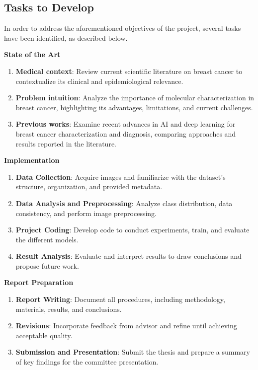 \documentclass[a4paper,10pt]{book}
\begin{document}
\subsection{Tasks to Develop}

In order to address the aforementioned objectives of the project, several tasks have been identified, as described below. 

\textbf{State of the Art}

\begin{enumerate}
	\item \textbf{Medical context}: Review current scientific literature on breast cancer to contextualize its clinical and epidemiological relevance.
	\item \textbf{Problem intuition}: Analyze the importance of molecular characterization in breast cancer, highlighting its advantages, limitations, and current challenges.
	\item \textbf{Previous works}: Examine recent advances in AI and deep learning for breast cancer characterization and diagnosis, comparing approaches and results reported in the literature.
\end{enumerate}

\textbf{Implementation}

\begin{enumerate}
	\item \textbf{Data Collection}: Acquire images and familiarize with the dataset's structure, organization, and provided metadata.
	\item \textbf{Data Analysis and Preprocessing}: Analyze class distribution, data consistency, and perform image preprocessing.
	\item \textbf{Project Coding}: Develop code to conduct experiments, train, and evaluate the different models.
	\item \textbf{Result Analysis}: Evaluate and interpret results to draw conclusions and propose future work.
\end{enumerate}

\textbf{Report Preparation}

\begin{enumerate}
	\item \textbf{Report Writing}: Document all procedures, including methodology, materials, results, and conclusions.
	\item \textbf{Revisions}: Incorporate feedback from advisor and refine until achieving acceptable quality.
	\item \textbf{Submission and Presentation}: Submit the thesis and prepare a summary of key findings for the committee presentation.
\end{enumerate}
\end{document}
